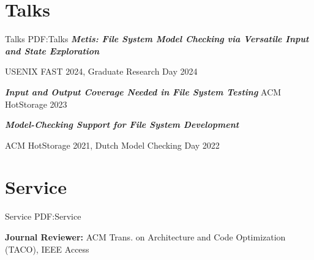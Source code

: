 \documentclass[a4paper,10pt,oneside]{article}
\begin{document}
\begin{body}




\section
{Talks}
{Talks}
{PDF:Talks}
\BulletItem
\textbf{\textit{Metis: File System Model Checking via Versatile Input and State Exploration}}

\SubBulletItem
USENIX FAST 2024, Graduate Research Day 2024 %


\GapNoBreak

\BulletItem
\textbf{\textit{Input and Output Coverage Needed in File System Testing}}
\SubBulletItem
ACM HotStorage 2023 %

\GapNoBreak

\BulletItem
\textbf{\textit{Model-Checking Support for File System Development}}

\SubBulletItem
ACM HotStorage 2021, Dutch Model Checking Day 2022




\section
{Service}
{Service}
{PDF:Service}


\textbf{Journal Reviewer:}
ACM Trans. on Architecture and Code Optimization (TACO), IEEE Access


\end{body}
\end{document}
